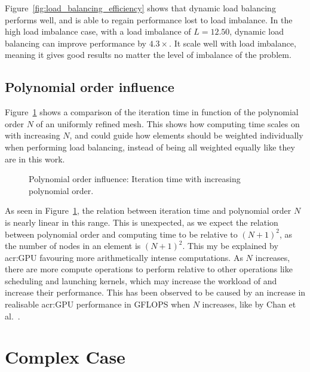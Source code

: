 Figure~\ref{fig:load_balancing_efficiency} shows that dynamic load balancing performs well, and is
able to regain performance lost to load imbalance. In the high load imbalance case, with a load
imbalance of \(L = 12.50\), dynamic load balancing can improve performance by \(4.3 \times \). It
scale well with load imbalance, meaning it gives good results no matter the level of imbalance of
the problem.

\subsection{Polynomial order influence}\label{subsection:results:load_balancing_performance:polynomial_order}

Figure~\ref{fig:N_influence} shows a comparison of the iteration time in function of the polynomial
order \(N\) of an uniformly refined mesh. This shows how computing time scales on
 with increasing \(N\), and could guide how elements should be weighted
individually when performing load balancing, instead of being all weighted equally like they are in
this work.

\begin{figure}[H]
	\centering
	
	\caption{Polynomial order influence: Iteration time with increasing polynomial order.}\label{fig:N_influence}
\end{figure}

As seen in Figure~\ref{fig:N_influence}, the relation between iteration time and polynomial order
\(N\) is nearly linear in this range. This is unexpected, as we expect the relation between
polynomial order and computing time to be relative to \({\left( N + 1 \right)}^2\), as the number of
nodes in an element is \({\left( N + 1 \right)}^2\). This my be explained by \acrshort{acr:GPU}
favouring more arithmetically intense computations. As \(N\) increases, there are more compute
operations to perform relative to other operations like scheduling and launching kernels, which may
increase the workload of  and increase their performance. This has been observed
to be caused by an increase in realisable \acrshort{acr:GPU} performance in GFLOPS when \(N\)
increases, like by Chan et al.~\cite{Chan2016}.

\section{Complex Case}\label{section:results:complex_application}

